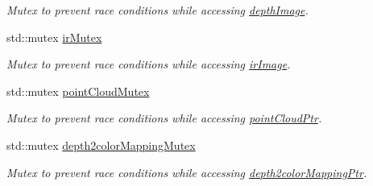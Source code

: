 \begin{DoxyCompactItemize}
\begin{DoxyCompactList}\small\item\em Mutex to prevent race conditions while accessing \hyperlink{classpersonal_robotics_1_1_kinect_reader_a4bfa3f18889f77253a76ecd2a6999e60}{depth\+Image}. \end{DoxyCompactList}\item 
\hypertarget{classpersonal_robotics_1_1_kinect_reader_adcd2d452bf2355b4142083201c23f024}{}std\+::mutex \hyperlink{classpersonal_robotics_1_1_kinect_reader_adcd2d452bf2355b4142083201c23f024}{ir\+Mutex}\label{classpersonal_robotics_1_1_kinect_reader_adcd2d452bf2355b4142083201c23f024}

\begin{DoxyCompactList}\small\item\em Mutex to prevent race conditions while accessing \hyperlink{classpersonal_robotics_1_1_kinect_reader_af191fde626809b8b09fd062de68df184}{ir\+Image}. \end{DoxyCompactList}\item 
\hypertarget{classpersonal_robotics_1_1_kinect_reader_a37b014e866d224763ea9675c0056a3d3}{}std\+::mutex \hyperlink{classpersonal_robotics_1_1_kinect_reader_a37b014e866d224763ea9675c0056a3d3}{point\+Cloud\+Mutex}\label{classpersonal_robotics_1_1_kinect_reader_a37b014e866d224763ea9675c0056a3d3}

\begin{DoxyCompactList}\small\item\em Mutex to prevent race conditions while accessing \hyperlink{classpersonal_robotics_1_1_kinect_reader_a0340f3ac6506c0205420120ba60f6614}{point\+Cloud\+Ptr}. \end{DoxyCompactList}\item 
\hypertarget{classpersonal_robotics_1_1_kinect_reader_a5c3da75401f463259923330d4dcb51c6}{}std\+::mutex \hyperlink{classpersonal_robotics_1_1_kinect_reader_a5c3da75401f463259923330d4dcb51c6}{depth2color\+Mapping\+Mutex}\label{classpersonal_robotics_1_1_kinect_reader_a5c3da75401f463259923330d4dcb51c6}

\begin{DoxyCompactList}\small\item\em Mutex to prevent race conditions while accessing \hyperlink{classpersonal_robotics_1_1_kinect_reader_a1c33dad149a819407956d19be1fb2966}{depth2color\+Mapping\+Ptr}. \end{DoxyCompactList}\end{DoxyCompactItemize}
